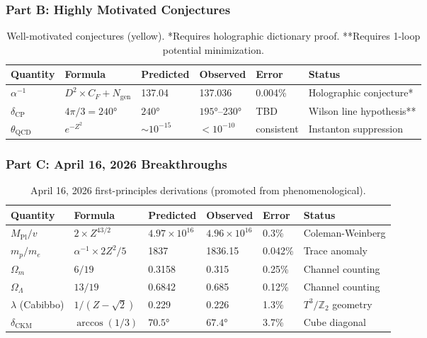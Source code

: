 \documentclass[11pt,a4paper]{article}
\theoremstyle{plain}
\theoremstyle{definition}
\theoremstyle{remark}
\newcommand{\Mpl}{M_{\text{Pl}}}
\newcommand{\CF}{C_F}
\newcommand{\Ngen}{N_{\text{gen}}}
\newcommand{\Omegam}{\Omega_m}
\newcommand{\OmegaL}{\Omega_\Lambda}
\newcommand{\Tthree}{T^3}
\newcommand{\Ztwo}{\mathbb{Z}_2}
\begin{document}
\subsubsection{Part B: Highly Motivated Conjectures}

\begin{table}[h!]
\centering
\begin{tabular}{llllll}
\toprule
\textbf{Quantity} & \textbf{Formula} & \textbf{Predicted} & \textbf{Observed} & \textbf{Error} & \textbf{Status} \\
\midrule
$\alpha^{-1}$ & $D^2 \times \CF + \Ngen$ & 137.04 & 137.036 & 0.004\% & Holographic conjecture* \\
$\delta_{\text{CP}}$ & $4\pi/3 = 240°$ & $240°$ & $195°$--$230°$ & TBD & Wilson line hypothesis** \\
$\theta_{\text{QCD}}$ & $e^{-Z^2}$ & $\sim 10^{-15}$ & $<10^{-10}$ & consistent & Instanton suppression \\
\bottomrule
\end{tabular}
\caption{Well-motivated conjectures (yellow). *Requires holographic dictionary proof. **Requires 1-loop potential minimization.}
\end{table}

\subsubsection{Part C: April 16, 2026 Breakthroughs}

\begin{table}[h!]
\centering
\begin{tabular}{llllll}
\toprule
\textbf{Quantity} & \textbf{Formula} & \textbf{Predicted} & \textbf{Observed} & \textbf{Error} & \textbf{Status} \\
\midrule
$\Mpl/v$ & $2 \times Z^{43/2}$ & $4.97 \times 10^{16}$ & $4.96 \times 10^{16}$ & 0.3\% & Coleman-Weinberg \\
$m_p/m_e$ & $\alpha^{-1} \times 2Z^2/5$ & 1837 & 1836.15 & 0.042\% & Trace anomaly \\
$\Omegam$ & $6/19$ & 0.3158 & 0.315 & 0.25\% & Channel counting \\
$\OmegaL$ & $13/19$ & 0.6842 & 0.685 & 0.12\% & Channel counting \\
$\lambda$ (Cabibbo) & $1/(Z - \sqrt{2})$ & 0.229 & 0.226 & 1.3\% & $\Tthree/\Ztwo$ geometry \\
$\delta_{\text{CKM}}$ & $\arccos(1/3)$ & $70.5°$ & $67.4°$ & 3.7\% & Cube diagonal \\
\bottomrule
\end{tabular}
\caption{April 16, 2026 first-principles derivations (promoted from phenomenological).}
\end{table}
\end{document}
